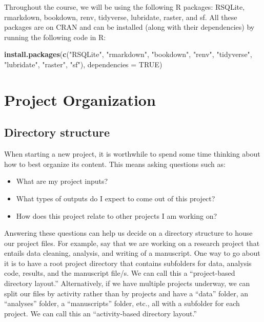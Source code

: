 \documentclass[
]{book}
\newenvironment{Shaded}{\begin{snugshade}}{\end{snugshade}}
\newcommand{\AttributeTok}[1]{\textcolor[rgb]{0.13,0.29,0.53}{#1}}
\newcommand{\ConstantTok}[1]{\textcolor[rgb]{0.56,0.35,0.01}{#1}}
\newcommand{\FunctionTok}[1]{\textcolor[rgb]{0.13,0.29,0.53}{\textbf{#1}}}
\newcommand{\NormalTok}[1]{#1}
\newcommand{\StringTok}[1]{\textcolor[rgb]{0.31,0.60,0.02}{#1}}
\providecommand{\tightlist}{%
  \setlength{\itemsep}{0pt}\setlength{\parskip}{0pt}}
\begin{document}
Throughout the course, we will be using the following R packages: RSQLite,
rmarkdown, bookdown, renv, tidyverse, lubridate, raster, and sf. All these
packages are on CRAN and can be installed (along with their dependencies) by
running the following code in R:

\begin{Shaded}
\begin{Highlighting}[]
\FunctionTok{install.packages}\NormalTok{(}\FunctionTok{c}\NormalTok{(}\StringTok{"RSQLite"}\NormalTok{,}
                   \StringTok{"rmarkdown"}\NormalTok{,}
                   \StringTok{"bookdown"}\NormalTok{,}
                   \StringTok{"renv"}\NormalTok{,}
                   \StringTok{"tidyverse"}\NormalTok{,}
                   \StringTok{"lubridate"}\NormalTok{,}
                   \StringTok{"raster"}\NormalTok{,}
                   \StringTok{"sf"}\NormalTok{), }\AttributeTok{dependencies =} \ConstantTok{TRUE}\NormalTok{)}
\end{Highlighting}
\end{Shaded}

\hypertarget{project-organization}{%
\chapter{Project Organization}\label{project-organization}}

\hypertarget{directory-structure}{%
\section{Directory structure}\label{directory-structure}}

When starting a new project, it is worthwhile to spend some time thinking about how to best organize its content. This means asking questions such as:

\begin{itemize}
\tightlist
\item
  What are my project inputs?
\item
  What types of outputs do I expect to come out of this project?
\item
  How does this project relate to other projects I am working on?
\end{itemize}

Answering these questions can help us decide on a directory structure to house our project files. For example, say that we are working on a research project that entails data cleaning, analysis, and writing of a manuscript. One way to go about it is to have a root project directory that contains subfolders for data, analysis code, results, and the manuscript file/s. We can call this a ``project-based directory layout.'' Alternatively, if we have multiple projects underway, we can split our files by activity rather than by projects and have a ``data'' folder, an ``analyses'' folder, a ``manuscripts'' folder, etc., all with a subfolder for each project. We can call this an ``activity-based directory layout.''
\end{document}

